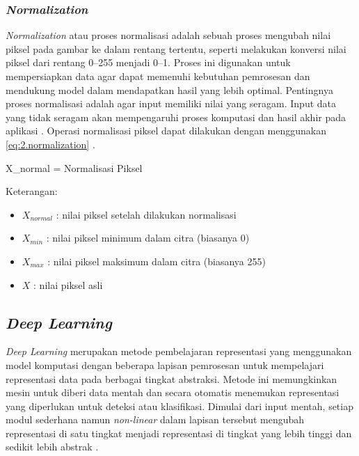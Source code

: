 
\subsubsection{\textit{Normalization}} \label{II.TeoriNormalization}
\textit{Normalization} atau proses normalisasi adalah sebuah proses mengubah nilai piksel pada gambar ke dalam rentang tertentu, seperti melakukan konversi nilai piksel dari rentang 0--255 menjadi 0--1. Proses ini digunakan untuk mempersiapkan data agar dapat memenuhi kebutuhan pemrosesan dan mendukung model dalam mendapatkan hasil yang lebih optimal. Pentingnya proses normalisasi adalah agar input memiliki nilai yang seragam. Input data yang tidak seragam akan mempengaruhi proses komputasi dan hasil akhir pada aplikasi \cite{Normalisasi}. Operasi normalisasi piksel dapat dilakukan dengan menggunakan \ref{eq:2.normalization} \cite{thesisNova}. \par

\vspace{0.5\baselineskip}
\begin{equationcaptioned}[eq:2.normalization]{
    X_{normal} = 
}{
    Normalisasi Piksel
}
\end{equationcaptioned}

Keterangan:
\begin{itemize}
\renewcommand\labelitemi{} %
    \item $X_{normal}$ : nilai piksel setelah dilakukan normalisasi
    \item $X_{min}$ : nilai piksel minimum dalam citra (biasanya 0)
    \item $X_{max}$ : nilai piksel maksimum dalam citra (biasanya 255)
    \item $X$ : nilai piksel asli
\end{itemize}

\subsection{\textit{Deep Learning}} \label{II.TeoriDeepLearning}
\textit{Deep Learning} merupakan metode pembelajaran representasi yang menggunakan model komputasi dengan beberapa lapisan pemrosesan untuk mempelajari representasi data pada berbagai tingkat abstraksi. Metode ini memungkinkan mesin untuk diberi data mentah dan secara otomatis menemukan representasi yang diperlukan untuk deteksi atau klasifikasi. Dimulai dari input mentah, setiap modul sederhana namun \textit{non-linear} dalam lapisan tersebut mengubah representasi di satu tingkat menjadi representasi di tingkat yang lebih tinggi dan sedikit lebih abstrak \cite{DeepLearning}. \par

